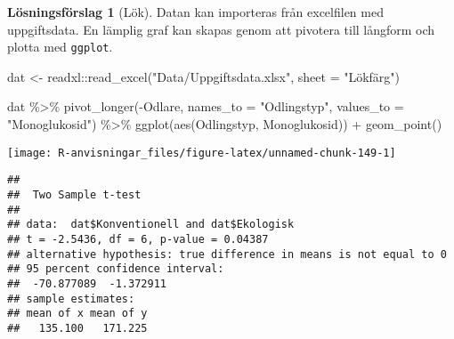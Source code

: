 \documentclass[
]{book}
\newenvironment{Shaded}{\begin{snugshade}}{\end{snugshade}}
\newcommand{\AttributeTok}[1]{\textcolor[rgb]{0.77,0.63,0.00}{#1}}
\newcommand{\FunctionTok}[1]{\textcolor[rgb]{0.00,0.00,0.00}{#1}}
\newcommand{\NormalTok}[1]{#1}
\newcommand{\OtherTok}[1]{\textcolor[rgb]{0.56,0.35,0.01}{#1}}
\newcommand{\SpecialCharTok}[1]{\textcolor[rgb]{0.00,0.00,0.00}{#1}}
\newcommand{\StringTok}[1]{\textcolor[rgb]{0.31,0.60,0.02}{#1}}
\theoremstyle{definition}
\theoremstyle{definition}
\theoremstyle{definition}
\theoremstyle{definition}
\newtheorem{hypothesis}{Lösningsförslag}[chapter]
\theoremstyle{remark}
\begin{document}
\begin{hypothesis}[Lök]
Datan kan importeras från excelfilen med uppgiftsdata. En lämplig graf kan skapas genom att pivotera till långform och plotta med \texttt{ggplot}.

\begin{Shaded}
\begin{Highlighting}[]
\NormalTok{dat }\OtherTok{\textless{}{-}}\NormalTok{ readxl}\SpecialCharTok{::}\FunctionTok{read\_excel}\NormalTok{(}\StringTok{"Data/Uppgiftsdata.xlsx"}\NormalTok{, }\AttributeTok{sheet =} \StringTok{"Lökfärg"}\NormalTok{)}

\NormalTok{dat }\SpecialCharTok{\%\textgreater{}\%} 
  \FunctionTok{pivot\_longer}\NormalTok{(}\SpecialCharTok{{-}}\NormalTok{Odlare, }\AttributeTok{names\_to =} \StringTok{"Odlingstyp"}\NormalTok{, }
               \AttributeTok{values\_to =} \StringTok{"Monoglukosid"}\NormalTok{) }\SpecialCharTok{\%\textgreater{}\%} 
  \FunctionTok{ggplot}\NormalTok{(}\FunctionTok{aes}\NormalTok{(Odlingstyp, Monoglukosid)) }\SpecialCharTok{+}
  \FunctionTok{geom\_point}\NormalTok{()}
\end{Highlighting}
\end{Shaded}

\begin{center}\texttt{[image: R-anvisningar\_files/figure-latex/unnamed-chunk-149-1]} \end{center}

\begin{Shaded}
\end{Shaded}

\begin{verbatim}
## 
##  Two Sample t-test
## 
## data:  dat$Konventionell and dat$Ekologisk
## t = -2.5436, df = 6, p-value = 0.04387
## alternative hypothesis: true difference in means is not equal to 0
## 95 percent confidence interval:
##  -70.877089  -1.372911
## sample estimates:
## mean of x mean of y 
##   135.100   171.225
\end{verbatim}

\begin{Shaded}
\end{Shaded}


\end{hypothesis}
\end{document}

